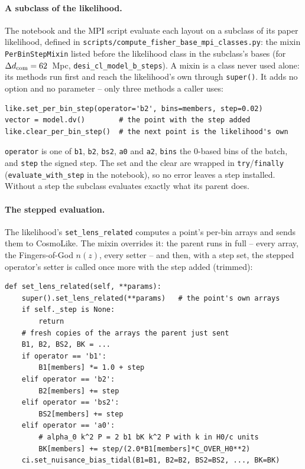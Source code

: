 \documentclass[11pt]{article}
\newcommand{\us}{\_\allowbreak}
\begin{document}
\paragraph{A subclass of the likelihood.}
The notebook and the MPI script evaluate each layout on a subclass of
its paper likelihood, defined in
\texttt{scripts/compute\us fisher\us base\us mpi\us classes.py}: the
mixin \texttt{PerBinStepMixin} listed before the likelihood class in
the subclass's bases (for $\Delta d_{\rm com} = 62$~Mpc,
\texttt{desi\us cl\us model\us b\us steps}).  A mixin is a class never
used alone: its methods run first and reach the likelihood's own
through \texttt{super()}.  It adds no option and no parameter -- only
three methods a caller uses:

\begin{lstlisting}
like.set_per_bin_step(operator='b2', bins=members, step=0.02)
vector = model.dv()        # the point with the step added
like.clear_per_bin_step()  # the next point is the likelihood's own
\end{lstlisting}

\noindent \texttt{operator} is one of \texttt{b1}, \texttt{b2},
\texttt{bs2}, \texttt{a0} and \texttt{a2}, \texttt{bins} the 0-based
bins of the batch, and \texttt{step} the signed step.  The set and the
clear are wrapped in \texttt{try}/\texttt{finally}
(\texttt{evaluate\us with\us step} in the notebook), so no error
leaves a step installed.  Without a step the subclass evaluates
exactly what its parent does.

\paragraph{The stepped evaluation.}
The likelihood's \texttt{set\us lens\us related} computes a point's
per-bin arrays and sends them to CosmoLike.  The mixin overrides it:
the parent runs in full -- every array, the Fingers-of-God $n(z)$,
every setter -- and then, with a step set, the stepped operator's
setter is called once more with the step added (trimmed):

\begin{lstlisting}
def set_lens_related(self, **params):
    super().set_lens_related(**params)   # the point's own arrays
    if self._step is None:
        return
    # fresh copies of the arrays the parent just sent
    B1, B2, BS2, BK = ...
    if operator == 'b1':
        B1[members] *= 1.0 + step
    elif operator == 'b2':
        B2[members] += step
    elif operator == 'bs2':
        BS2[members] += step
    elif operator == 'a0':
        # alpha_0 k^2 P = 2 b1 bK k^2 P with k in H0/c units
        BK[members] += step/(2.0*B1[members]*C_OVER_H0**2)
    ci.set_nuisance_bias_tidal(B1=B1, B2=B2, BS2=BS2, ..., BK=BK)
\end{lstlisting}
\end{document}
